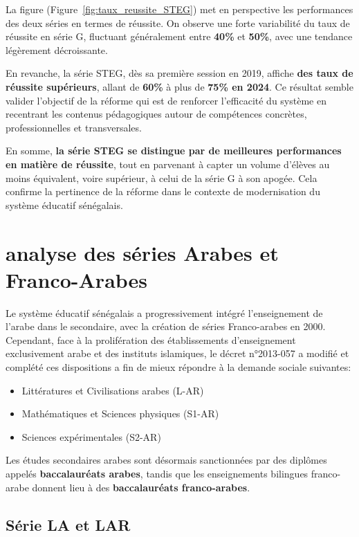 La figure (Figure~\ref{fig:taux_reussite_STEG}) met en perspective les performances des deux séries en termes de réussite. 
On observe une forte variabilité du taux de réussite en série G, fluctuant généralement entre \textbf{40\%} et \textbf{50\%}, avec une tendance légèrement décroissante.

En revanche, la série STEG, dès sa première session en 2019, affiche \textbf{des taux de réussite supérieurs}, allant de \textbf{60\%} à plus de \textbf{75\% en 2024}.
Ce résultat semble valider l’objectif de la réforme qui est de renforcer l'efficacité du système en recentrant les contenus pédagogiques autour de compétences concrètes, professionnelles et transversales.

\bigskip

En somme, \textbf{la série STEG se distingue par de meilleures performances en matière de réussite}, tout en parvenant à capter un volume d’élèves au moins équivalent, voire supérieur, à celui de la série G à son apogée. 
Cela confirme la pertinence de la réforme dans le contexte de modernisation du système éducatif sénégalais.

\newpage
\section{analyse des séries Arabes et Franco-Arabes}

Le système éducatif sénégalais a progressivement intégré l'enseignement de l'arabe dans le secondaire, avec la création de séries Franco-arabes en 2000.
Cependant, face à la prolifération des établissements d'enseignement exclusivement arabe et des instituts islamiques, le décret n°2013-057 a modifié et complété ces dispositions a fin de mieux répondre à la demande sociale suivantes: 
\begin{itemize}
    \item Littératures et Civilisations arabes (L-AR)
    \item Mathématiques et Sciences physiques (S1-AR)
    \item Sciences expérimentales (S2-AR)
\end{itemize}

Les études secondaires arabes sont désormais sanctionnées par des diplômes appelés \textbf{baccalauréats arabes}, tandis que les enseignements bilingues franco-arabe donnent lieu à des \textbf{baccalauréats franco-arabes}.
\subsection{Série LA et LAR}

